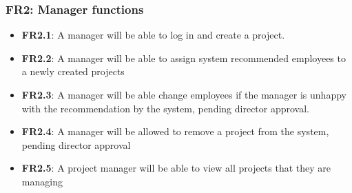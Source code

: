 \documentclass[a4paper,12pt]{article}
\begin{document}
	\subsubsection{FR2: Manager functions}
	\begin{itemize}
		\item \textbf{FR2.1}: A manager will be able to log in and create a project.
		
		\item \textbf{FR2.2}: A manager will be able to assign system recommended employees to a      newly created projects
		
		\item \textbf{FR2.3}: A manager will be able change employees if the manager is unhappy with     the recommendation by the system, pending director approval.
		
		\item \textbf{FR2.4}: A manager will be allowed to remove a project from the system, pending director approval
		
		\item \textbf{FR2.5}: A project manager will be able to view all projects that they are managing
	\end{itemize}
	
\end{document}
